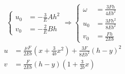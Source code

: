 \documentclass[12pt,fontset=windows]{ctexart}
\newcommand{\answerPar}[1]{{\kaishu{#1}}}
\begin{document}
\begin{enumerate}
\begin{gather*}
\begin{cases}
			u_0 & =-\frac{3}{E}Ah^2 \\
			v_0 & =-\frac{2}{E}Bh
		\end{cases}
		\Longrightarrow
		\begin{cases}
			\omega & = \frac{3Fh}{4Eb^2} \\
			u_0 & = \frac{3Fh^2}{8Eb^2} \\
			v_0 & = \frac{Fh}{2Eb}
		\end{cases}
	\end{gather*}
	\answerPar{故：}
	\begin{align*}
		u & = \frac{\mu F}{2Eb}\left(x+\frac{3}{4b}x^2\right)+\frac{3F}{8Eb^2}(h-y)^2 \\
		v & =\frac{F}{2Eb}(h-y)\left(1+\frac{3}{2b}x\right)
	\end{align*}

\end{enumerate}
\end{document}

